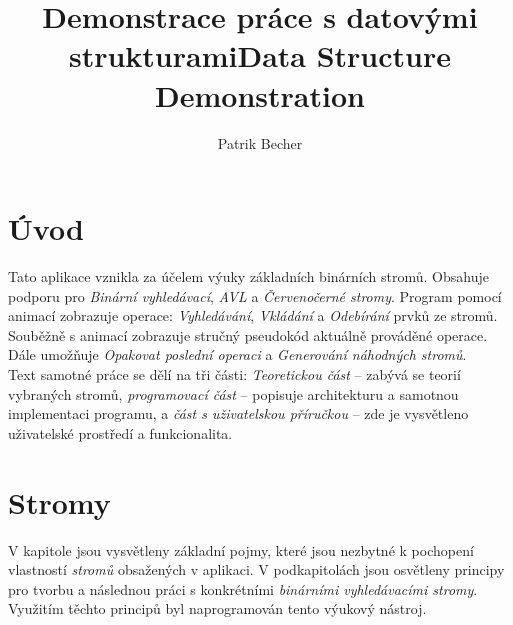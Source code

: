 \documentclass[
  biblatex=false,
  font=serif,
  glossaries=false,
  tables=false,
  theorems=false,
  index
]{kidiplom}
\title{Demonstrace práce s datovými strukturami}
\title[english]{Data Structure Demonstration}
\author{Patrik Becher}
\begin{document}


\maketitle



\section{Úvod}
\indent\indent Tato aplikace vznikla za účelem výuky základních binárních stromů. Obsahuje podporu pro \textit{Binární vyhledávací}, \textit{AVL} a \textit{Červenočerné stromy}. Program pomocí animací zobrazuje operace: \textit{Vyhledávání}, \textit{Vkládání} a \textit{Odebírání} prvků ze stromů. Souběžně s animací zobrazuje stručný pseudokód aktuálně prováděné operace. Dále umožňuje \textit{Opakovat poslední operaci} a \textit{Generování náhodných stromů}.\\
\indent Text samotné práce se dělí na tři části: \textit{Teoretickou část} -- zabývá se teorií vybraných stromů, \textit{programovací část} -- popisuje architekturu a samotnou implementaci programu, a \textit{část s uživatelskou příručkou} --  zde je vysvětleno uživatelské prostředí a funkcionalita.

\newpage
\section{Stromy}
\indent \indent V kapitole jsou vysvětleny základní pojmy, které jsou nezbytné k pochopení vlastností \textit{stromů} obsažených v aplikaci. V podkapitolách jsou osvětleny principy pro tvorbu a následnou práci s konkrétními \textit{binárními vyhledávacími stromy}. Využitím těchto principů byl naprogramován tento výukový nástroj.\\
\end{document}
